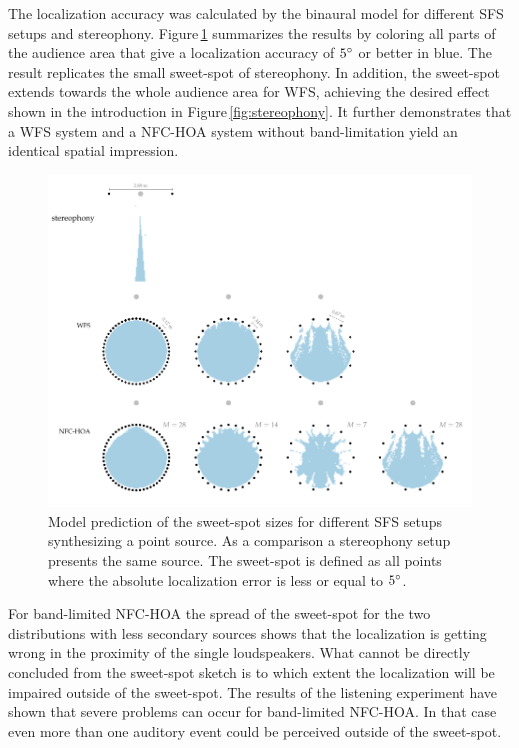 The localization accuracy was calculated by the binaural model for different
\ac{SFS} setups and stereophony. Figure\,\ref{fig:sweet-spot-size} summarizes
the results by coloring all parts of the audience area that give a
localization accuracy of $5^\circ$ or better in blue.
The result replicates the small sweet-spot of stereophony. In addition,
the sweet-spot extends towards the whole audience area for \ac{WFS}, achieving the
desired effect shown in the introduction in Figure\,\ref{fig:stereophony}.
It further demonstrates that a \ac{WFS} system and a
\ac{NFC-HOA} system without band-limitation yield an identical spatial
impression.
%
\begin{figure}
    \centering
    \includegraphics{fig6_08/fig6_08}
    \caption{Model prediction of the sweet-spot sizes for different \ac{SFS}
    setups synthesizing a point source. As a comparison a stereophony setup
    presents the same source.
    The sweet-spot is defined as all points where the absolute localization error
    is less or equal to $5^\circ$.
    }
    \label{fig:sweet-spot-size}
\end{figure}

\newpage

For band-limited \ac{NFC-HOA} the spread of the sweet-spot for the two
distributions with less secondary sources shows that the localization is getting
wrong in the proximity of the single loudspeakers.
What cannot be directly concluded from the sweet-spot sketch is to which extent
the localization will be impaired outside of the sweet-spot.
The results of the listening experiment have shown that severe problems can occur
for band-limited \ac{NFC-HOA}.
In that case even more than one auditory event could be perceived outside of the sweet-spot.


